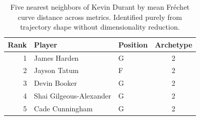 \begin{table}[htbp]
  \centering\small
  \begin{tabular}{rllc}
    \toprule
    Rank & Player & Position & Archetype \\
    \midrule
    1 & James Harden & G & 2 \\
    2 & Jayson Tatum & F & 2 \\
    3 & Devin Booker & G & 2 \\
    4 & Shai Gilgeous-Alexander & G & 2 \\
    5 & Cade Cunningham & G & 2 \\
    \bottomrule
  \end{tabular}
  \caption{Five nearest neighbors of Kevin Durant by mean Fr\'{e}chet curve distance across metrics. Identified purely from trajectory shape without dimensionality reduction.}
  \label{tab:Kevin_Durant_frechet_curve_neighbors}
\end{table}

